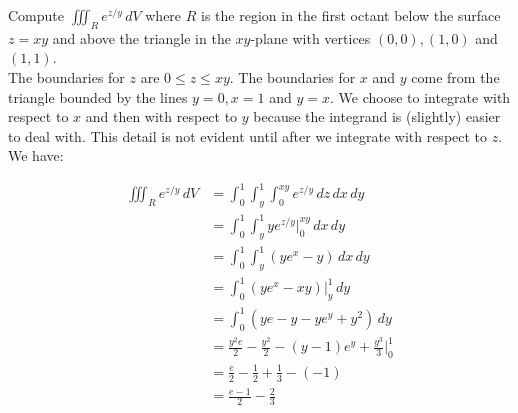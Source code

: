 \documentclass[handout]{ximera}
\begin{document}
\begin{example}[Example 3]
Compute $\iiint_R  e^{z/y} \, dV$ where $R$ is the region in the first octant below the 
surface $z = xy$ and above the triangle in the $xy$-plane with vertices $(0,0), (1,0)$ and $(1,1)$.\\


The boundaries for $z$ are $0 \leq z \leq xy$. The boundaries for $x$ and $y$ come from the triangle bounded by the lines
$y = 0, x = 1$ and $y = x$.  We choose to integrate with respect to $x$ and then with respect to $y$ because the
integrand is (slightly) easier to deal with.  This detail is not evident until after we integrate with respect to $z$.
We have:

\begin{align*}
\iiint_R e^{z/y} \, dV & = \int_0^1 \int_y^1 \int_0^{xy} e^{z/y} \, dz \, dx \, dy\\
                 & = \int_0^1 \int_y^1 ye^{z/y}\bigg|_{0}^{xy} \,dx \, dy\\
                 & = \int_0^1 \int_y^1 \left(ye^x - y\right) \,dx \, dy\\
                 &= \int_0^1 \left(ye^x - xy\right) \bigg|_y^1 \, dy\\
                 &= \int_0^1 \left(ye - y - ye^y + y^2\right) \, dy\\
                 &= \frac{y^2 e}{2} - \frac{y^2}{2} - (y-1)e^y + \frac{y^3}{3} \bigg|_0^1\\
                 &= \frac{e}{2} - \frac12 + \frac13 - (-1)\\
                 &= \frac{e-1}{2} - \frac23
\end{align*} 

\end{example}
\end{document}
